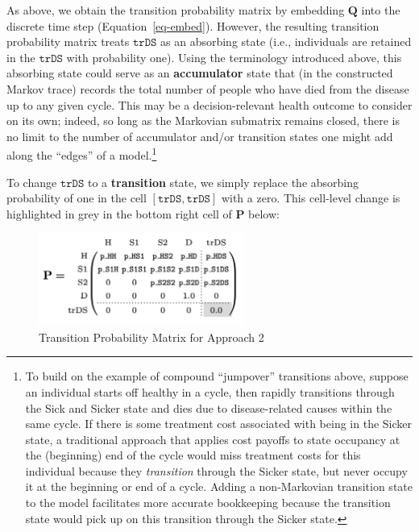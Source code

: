 \documentclass[
]{agujournal2019}
\begin{document}
As above, we obtain the transition probability matrix by embedding
\(\mathbf{Q}\) into the discrete time step (Equation~\ref{eq-embed}).
However, the resulting transition probability matrix treats
\(\texttt{trDS}\) as an absorbing state (i.e., individuals are retained
in the \(\texttt{trDS}\) with probability one). Using the terminology
introduced above, this absorbing state could serve as an
\textbf{accumulator} state that (in the constructed Markov trace)
records the total number of people who have died from the disease up to
any given cycle. This may be a decision-relevant health outcome to
consider on its own; indeed, so long as the Markovian submatrix remains
closed, there is no limit to the number of accumulator and/or transition
states one might add along the ``edges'' of a model.\footnote{To build
  on the example of compound ``jumpover'' transitions above, suppose an
  individual starts off healthy in a cycle, then rapidly transitions
  through the Sick and Sicker state and dies due to disease-related
  causes within the same cycle. If there is some treatment cost
  associated with being in the Sicker state, a traditional approach that
  applies cost payoffs to state occupancy at the (beginning) end of the
  cycle would miss treatment costs for this individual because they
  \emph{transition} through the Sicker state, but never occupy it at the
  beginning or end of a cycle. Adding a non-Markovian transition state
  to the model facilitates more accurate bookkeeping because the
  transition state would pick up on this transition through the Sicker
  state.}

To change \(\texttt{trDS}\) to a \textbf{transition} state, we simply
replace the absorbing probability of one in the cell
\([\texttt{trDS},\texttt{trDS}]\) with a zero. This cell-level change is
highlighted in grey in the bottom right cell of \(\mathbf{P}\) below:

\begin{figure}[H]

{\centering \includegraphics[width=0.6\textwidth,height=\textheight]{images/P_model1.png}

}

\caption{Transition Probability Matrix for Approach 2}

\end{figure}%
\end{document}
